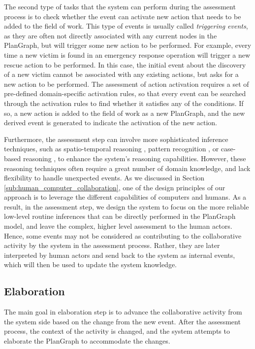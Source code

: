 The second type of tasks that the system can perform during the assessment process is to check whether the event can activate new action that needs to be added to the field of work. This type of events is usually called \emph{triggering events}, as they are often not directly associated with any current nodes in the PlanGraph, but will trigger some new action to be performed. For example, every time a new victim is found in an emergency response operation will trigger a new rescue action to be performed. In this case, the initial event about the discovery of a new victim cannot be associated with any existing actions, but asks for a new action to be performed. The assessment of action activation requires a set of pre-defined domain-specific activation rules, so that every event can be searched through the activation rules to find whether it satisfies any of the conditions. If so, a new action is added to the field of work as a new PlanGraph, and the new derived event is generated to indicate the activation of the new action.

Furthermore, the assessment step can involve more sophisticated inference techniques, such as spatio-temporal reasoning \cite{Bennett}, pattern recognition \cite{zelnik2001event}, or case-based reasoning \cite{jakobson2004towards}, to enhance the system's reasoning capabilities. However, these reasoning techniques often require a great number of domain knowledge, and lack flexibility to handle unexpected events. As we discussed in Section \ref{sub:human_computer_collaboration}, one of the design principles of our approach is to leverage the different capabilities of computers and humans. As a result, in the assessment step, we design the system to focus on the more reliable low-level routine inferences that can be directly performed in the PlanGraph model, and leave the complex, higher level assessment to the human actors. Hence,
some events may not be considered as contributing to the collaborative activity by the system in the assessment process. Rather, they are later interpreted by human actors and send back to the system as internal events, which will then be used to update the system knowledge.

\subsection{Elaboration} %
\label{sub:elaboration}
The main goal in elaboration step is to advance the collaborative activity from the system side based on the change from the new event. After the assessment process, the context of the activity is changed, and the system attempts to elaborate the PlanGraph to accommodate the changes. 

